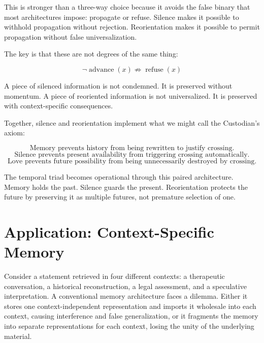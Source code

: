 \documentclass[12pt]{article}
\begin{document}
This is stronger than a three-way choice because it avoids the false binary that most architectures impose: propagate or refuse. Silence makes it possible to withhold propagation without rejection. Reorientation makes it possible to permit propagation without false universalization.

The key is that these are not degrees of the same thing:

\begin{equation}
\boxed{\neg \operatorname{advance}(x) \not\Rightarrow \operatorname{refuse}(x)}
\end{equation}

A piece of silenced information is not condemned. It is preserved without momentum. A piece of reoriented information is not universalized. It is preserved with context-specific consequences.

Together, silence and reorientation implement what we might call the Custodian's axiom:

\begin{equation}
\boxed{\text{Memory prevents history from being rewritten to justify crossing.}}
\end{equation}
\begin{equation}
\boxed{\text{Silence prevents present availability from triggering crossing automatically.}}
\end{equation}
\begin{equation}
\boxed{\text{Love prevents future possibility from being unnecessarily destroyed by crossing.}}
\end{equation}

The temporal triad becomes operational through this paired architecture. Memory holds the past. Silence guards the present. Reorientation protects the future by preserving it as multiple futures, not premature selection of one.

\section{Application: Context-Specific Memory}

Consider a statement retrieved in four different contexts: a therapeutic conversation, a historical reconstruction, a legal assessment, and a speculative interpretation. A conventional memory architecture faces a dilemma. Either it stores one context-independent representation and imports it wholesale into each context, causing interference and false generalization, or it fragments the memory into separate representations for each context, losing the unity of the underlying material.
\end{document}
